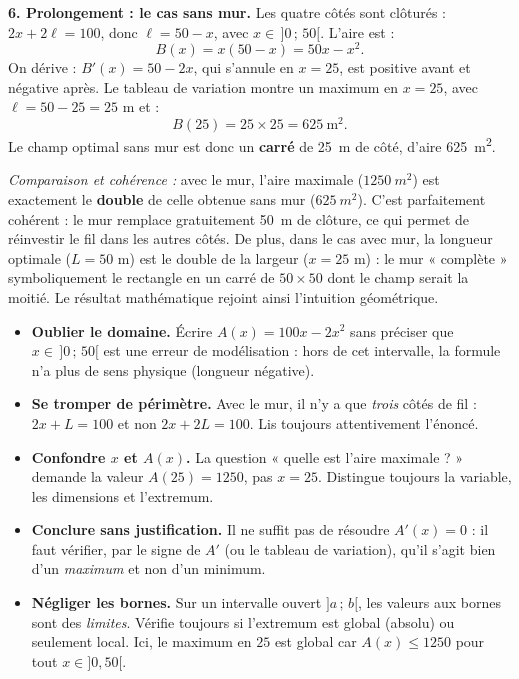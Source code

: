 \documentclass[11pt]{article}
\begin{document}
\begin{exoresolu}
\textbf{6. Prolongement : le cas sans mur.} Les quatre côtés sont clôturés : $2x + 2\ell = 100$, donc $\ell = 50 - x$, avec $x \in \,]0\,;\,50[$. L'aire est :
\[ B(x) = x(50 - x) = 50x - x^2. \]
On dérive : $B'(x) = 50 - 2x$, qui s'annule en $x = 25$, est positive avant et négative après. Le tableau de variation montre un maximum en $x = 25$, avec $\ell = 50 - 25 = 25$ m et :
\[ B(25) = 25 \times 25 = 625 \ \text{m}^2. \]
Le champ optimal sans mur est donc un \textbf{carré} de \SI{25}{m} de côté, d'aire \SI{625}{m^2}.

\emph{Comparaison et cohérence :} avec le mur, l'aire maximale ($\SI{1250}{m^2}$) est exactement le \textbf{double} de celle obtenue sans mur ($\SI{625}{m^2}$). C'est parfaitement cohérent : le mur remplace gratuitement \SI{50}{m} de clôture, ce qui permet de réinvestir le fil dans les autres côtés. De plus, dans le cas avec mur, la longueur optimale ($L = 50$ m) est le double de la largeur ($x = 25$ m) : le mur « complète » symboliquement le rectangle en un carré de $50 \times 50$ dont le champ serait la moitié. Le résultat mathématique rejoint ainsi l'intuition géométrique.
\end{exoresolu}

\begin{attention}
\begin{itemize}
\item \textbf{Oublier le domaine.} Écrire $A(x) = 100x - 2x^2$ sans préciser que $x \in \,]0\,;\,50[$ est une erreur de modélisation : hors de cet intervalle, la formule n'a plus de sens physique (longueur négative).
\item \textbf{Se tromper de périmètre.} Avec le mur, il n'y a que \emph{trois} côtés de fil : $2x + L = 100$ et non $2x + 2L = 100$. Lis toujours attentivement l'énoncé.
\item \textbf{Confondre $x$ et $A(x)$.} La question « quelle est l'aire maximale ? » demande la valeur $A(25) = 1250$, pas $x = 25$. Distingue toujours la variable, les dimensions et l'extremum.
\item \textbf{Conclure sans justification.} Il ne suffit pas de résoudre $A'(x) = 0$ : il faut vérifier, par le signe de $A'$ (ou le tableau de variation), qu'il s'agit bien d'un \emph{maximum} et non d'un minimum.
\item \textbf{Négliger les bornes.} Sur un intervalle ouvert $]a\,;\,b[$, les valeurs aux bornes sont des \emph{limites}. Vérifie toujours si l'extremum est global (absolu) ou seulement local. Ici, le maximum en $25$ est global car $A(x) \leq 1250$ pour tout $x \in ]0,50[$.
\end{itemize}
\end{attention}
\end{document}

